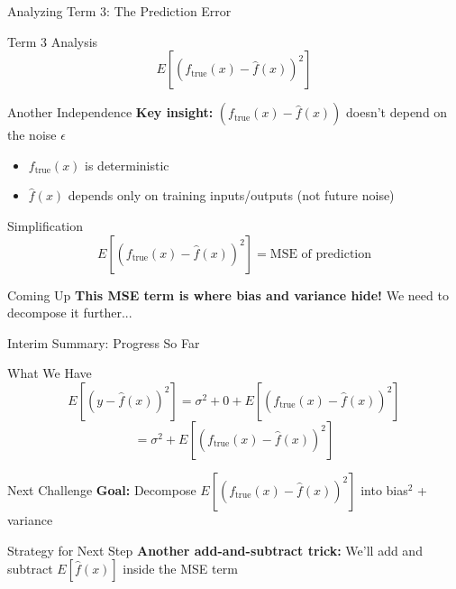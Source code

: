 \documentclass[10pt]{beamer}
\begin{document}
\begin{frame}{Analyzing Term 3: The Prediction Error}
\begin{definitionbox}{Term 3 Analysis}
$$E[(f_{\text{true}}(x) - \hat{f}(x))^2]$$
\end{definitionbox}

\begin{keypointsbox}{Another Independence}
\textbf{Key insight:} $(f_{\text{true}}(x) - \hat{f}(x))$ doesn't depend on the noise $\epsilon$
\begin{itemize}
\item $f_{\text{true}}(x)$ is deterministic
\item $\hat{f}(x)$ depends only on training inputs/outputs (not future noise)
\end{itemize}
\end{keypointsbox}

\begin{examplebox}{Simplification}
$$E[(f_{\text{true}}(x) - \hat{f}(x))^2] = \text{MSE of prediction}$$
\end{examplebox}

\begin{alertbox}{Coming Up}
\textbf{This MSE term is where bias and variance hide!} We need to decompose it further...
\end{alertbox}
\end{frame}

\begin{frame}{Interim Summary: Progress So Far}
\begin{definitionbox}{What We Have}
$$E[(y - \hat{f}(x))^2] = \sigma^2 + 0 + E[(f_{\text{true}}(x) - \hat{f}(x))^2]$$
$$= \sigma^2 + E[(f_{\text{true}}(x) - \hat{f}(x))^2]$$
\end{definitionbox}

\begin{keypointsbox}{Next Challenge}
\textbf{Goal:} Decompose $E[(f_{\text{true}}(x) - \hat{f}(x))^2]$ into bias$^2$ + variance
\end{keypointsbox}

\begin{examplebox}{Strategy for Next Step}
\textbf{Another add-and-subtract trick:} We'll add and subtract $E[\hat{f}(x)]$ inside the MSE term
\end{examplebox}
\end{frame}
\end{document}
